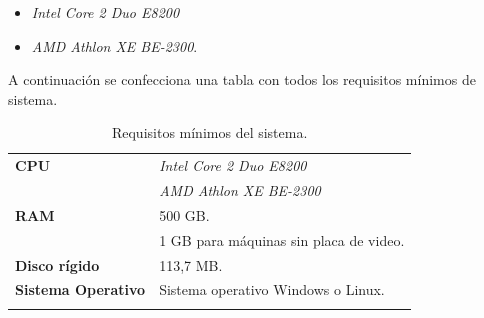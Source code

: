 \begin{itemize}
\item \textit{Intel Core 2 Duo E8200}
\item \textit{AMD Athlon XE BE-2300}.
\end{itemize}

A continuación se confecciona una tabla con todos los requisitos mínimos de sistema.

\begin{longtable}{|l|l|}
    \hline
    \textbf{CPU} & \textit{Intel Core 2 Duo E8200}\\
                 & \textit{AMD Athlon XE BE-2300}\\
    \hline
    \textbf{RAM} & 500 GB.\\
                 & 1 GB para máquinas sin placa de video.\\
    \hline
    \textbf{Disco rígido} & 113,7 MB.\\
    \hline
    \textbf{Sistema Operativo} & Sistema operativo Windows o Linux.\\
    \hline
    \caption{Requisitos mínimos del sistema.}\\
\end{longtable}

